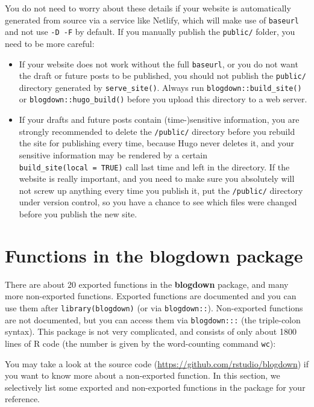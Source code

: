 \documentclass[12pt,]{krantz}
\theoremstyle{definition}
\theoremstyle{definition}
\theoremstyle{definition}
\theoremstyle{remark}
\begin{document}
You do not need to worry about these details if your website is
automatically generated from source via a service like Netlify, which
will make use of \texttt{baseurl} and not use \texttt{-D\ -F} by
default. If you manually publish the \texttt{public/} folder, you need
to be more careful:

\begin{itemize}
\item
  If your website does not work without the full \texttt{baseurl}, or
  you do not want the draft or future posts to be published, you should
  not publish the \texttt{public/} directory generated by
  \texttt{serve\_site()}. Always run \texttt{blogdown::build\_site()} or
  \texttt{blogdown::hugo\_build()} before you upload this directory to a
  web server.
\item
  If your drafts and future posts contain (time-)sensitive information,
  you are strongly recommended to delete the \texttt{/public/} directory
  before you rebuild the site for publishing every time, because Hugo
  never deletes it, and your sensitive information may be rendered by a
  certain \texttt{build\_site(local\ =\ TRUE)} call last time and left
  in the directory. If the website is really important, and you need to
  make sure you absolutely will not screw up anything every time you
  publish it, put the \texttt{/public/} directory under version control,
  so you have a chance to see which files were changed before you
  publish the new site.
\end{itemize}

\section{Functions in the blogdown package}\label{functions}

There are about 20 exported functions in the
\textbf{blogdown} package, and many more non-exported functions.
Exported functions are documented and you can use them after
\texttt{library(blogdown)} (or via \texttt{blogdown::}). Non-exported
functions are not documented, but you can access them via
\texttt{blogdown:::} (the triple-colon syntax). This package is not very
complicated, and consists of only about 1800 lines of R code (the number
is given by the word-counting command \texttt{wc}):

You may take a look at the source code
(\url{https://github.com/rstudio/blogdown}) if you want to know more
about a non-exported function. In this section, we selectively list some
exported and non-exported functions in the package for your reference.
\end{document}
